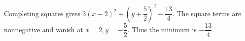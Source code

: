 Completing squares gives $3(x-2)^2+(y+\dfrac{5}{2})^2-\dfrac{13}{4}$. The square terms are nonnegative and vanish at $x=2,y=-\dfrac{5}{2}$. Thus the minimum is $\boxed{-\dfrac{13}{4}}$.
